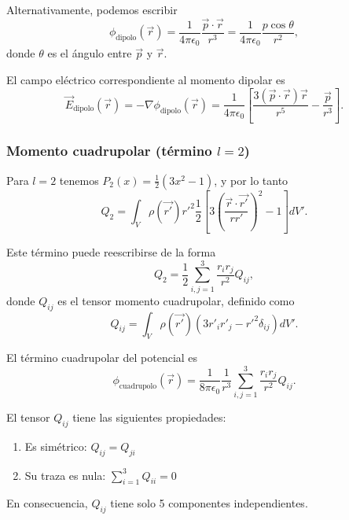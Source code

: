 \documentclass[12pt,a4paper]{book}
\begin{document}
Alternativamente, podemos escribir
\begin{equation}
\phi_{\text{dipolo}}(\vec{r}) = \frac{1}{4\pi\epsilon_0}\frac{\vec{p}\cdot\vec{r}}{r^3} = \frac{1}{4\pi\epsilon_0}\frac{p\cos\theta}{r^2},
\end{equation}
donde $\theta$ es el ángulo entre $\vec{p}$ y $\vec{r}$.

El campo eléctrico correspondiente al momento dipolar es
\begin{equation}
\vec{E}_{\text{dipolo}}(\vec{r}) = -\nabla\phi_{\text{dipolo}}(\vec{r}) = \frac{1}{4\pi\epsilon_0}\left[\frac{3(\vec{p}\cdot\vec{r})\vec{r}}{r^5} - \frac{\vec{p}}{r^3}\right].
\end{equation}

\subsubsection{Momento cuadrupolar (término $l=2$)}

Para $l=2$ tenemos $P_2(x) = \frac{1}{2}(3x^2 - 1)$, y por lo tanto
\begin{equation}
Q_2 = \int_V \rho(\vec{r'})r'^2 \frac{1}{2}\left[3\left(\frac{\vec{r}\cdot\vec{r'}}{rr'}\right)^2 - 1\right] dV'.
\end{equation}

Este término puede reescribirse de la forma
\begin{equation}
Q_2 = \frac{1}{2}\sum_{i,j=1}^{3}\frac{r_i r_j}{r^2}Q_{ij},
\end{equation}
donde $Q_{ij}$ es el tensor momento cuadrupolar, definido como
\begin{equation}
Q_{ij} = \int_V \rho(\vec{r'})(3r'_i r'_j - r'^2\delta_{ij}) dV'.
\end{equation}

El término cuadrupolar del potencial es
\begin{equation}
\phi_{\text{cuadrupolo}}(\vec{r}) = \frac{1}{8\pi\epsilon_0}\frac{1}{r^3}\sum_{i,j=1}^{3}\frac{r_i r_j}{r^2}Q_{ij}.
\end{equation}

El tensor $Q_{ij}$ tiene las siguientes propiedades:
\begin{enumerate}
\item Es simétrico: $Q_{ij} = Q_{ji}$
\item Su traza es nula: $\sum_{i=1}^{3}Q_{ii} = 0$
\end{enumerate}

En consecuencia, $Q_{ij}$ tiene solo 5 componentes independientes.
\end{document}
